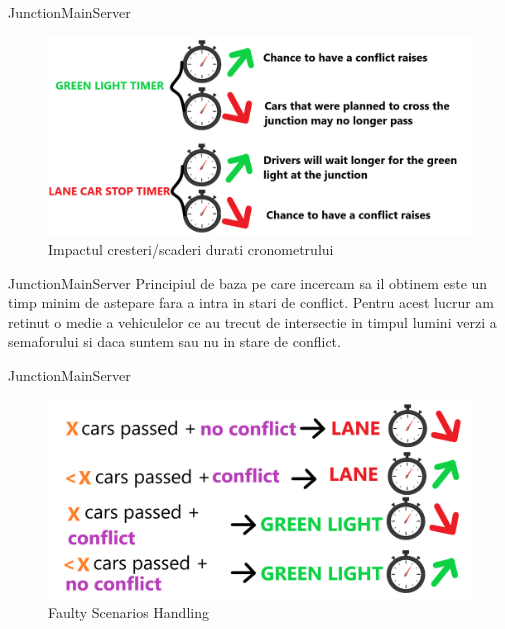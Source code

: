 \documentclass{beamer}
\begin{document}
    \begin{frame}{JunctionMainServer}
        \begin{figure}[h!]
            \includegraphics[width=\textwidth]{Sketches/TimerIncreaseDecreaseImpact.png}
            \caption{Impactul cresteri/scaderi durati cronometrului}
            \label{fig:Timer Increase/Decrease Impact}
        \end{figure}
    \end{frame}

    \begin{frame}{JunctionMainServer}
        Principiul de baza pe care incercam sa il obtinem este un timp 
        minim de astepare fara a intra in stari de conflict. Pentru 
        acest lucrur am retinut o medie a vehiculelor ce au trecut 
        de intersectie in timpul lumini verzi a semaforului si daca 
        suntem sau nu in stare de conflict.
    \end{frame}

    \begin{frame}{JunctionMainServer}    
        \begin{figure}[h!]
            \includegraphics[width=\textwidth]{Sketches/FaultyScenariosHandling.png}
            \caption{Faulty Scenarios Handling}
            \label{fig:Faulty Scenarios Handling}
        \end{figure}
    \end{frame}
\end{document}
